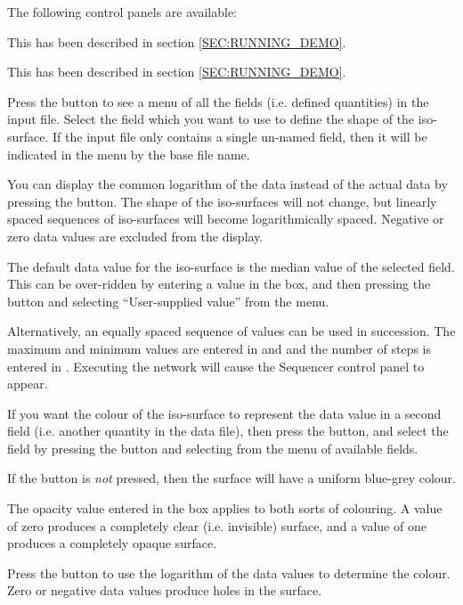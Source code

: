 The following control panels are available:
\begin{description}

This has been described in section \ref{SEC:RUNNING_DEMO}.

This has been described in section \ref{SEC:RUNNING_DEMO}.

Press the  button to see a menu of all the
fields (i.e. defined quantities) in the input file. Select the field
which you want to use to define the shape of the iso-surface.
If the input file only contains a single un-named field, then it will be
indicated in the menu by the base file name.

You can display the common logarithm of the data instead of the actual
data by pressing the  button. The
shape of the iso-surfaces will not change, but linearly spaced sequences
of iso-surfaces will become logarithmically spaced.  Negative or zero
data values are excluded from the display.

The default data value for the iso-surface is the median value of the
selected field. This can be over-ridden by entering a value in the
 box, and then pressing the  button and selecting ``User-supplied value'' from the menu.

Alternatively, an equally spaced sequence of values can be used in
succession. The maximum and minimum values are entered in  and  and the number of steps is entered in
. Executing the network will cause the Sequencer
control panel to appear.

If you want the colour of the iso-surface to represent the data value in
a second field (i.e. another quantity in the data file), then press the  button,
and select the field by pressing the  button and selecting from the menu of available fields.

If the  button is {\em
not} pressed, then the surface will have a uniform blue-grey colour.

The opacity value entered in the  box applies to
both sorts of colouring. A value of zero produces a completely clear
(i.e. invisible) surface, and a value of one produces a completely opaque
surface.

Press the  button to use the logarithm of
the data values to determine the colour. Zero or negative data values
produce holes in the surface.

\end{description}


